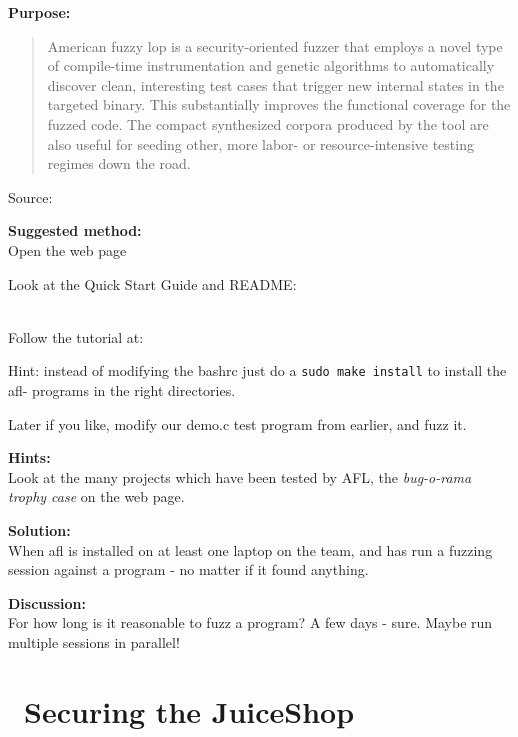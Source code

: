 \documentclass[a4paper,11pt,notitlepage]{report}
\begin{document}
{\bf Purpose:}
\begin{quote}
American fuzzy lop is a security-oriented fuzzer that employs a novel type of compile-time instrumentation and genetic algorithms to automatically discover clean, interesting test cases that trigger new internal states in the targeted binary. This substantially improves the functional coverage for the fuzzed code. The compact synthesized corpora produced by the tool are also useful for seeding other, more labor- or resource-intensive testing regimes down the road.
\end{quote}
Source: 

{\bf Suggested method:}\\
Open the web page 

Look at the Quick Start Guide and README:\\
\\

Follow the tutorial at:\\

Hint: instead of modifying the bashrc just do a \verb+sudo make install+ to install the afl- programs in the right directories.

Later if you like, modify our demo.c test program from earlier, and fuzz it.

{\bf Hints:}\\
Look at the many projects which have been tested by AFL, the \emph{bug-o-rama trophy case} on the web page.

{\bf Solution:}\\
When afl is installed on at least one laptop on the team, and has run a fuzzing session against a program - no matter if it found anything.

{\bf Discussion:}\\
For how long is it reasonable to fuzz a program? A few days - sure. Maybe run multiple sessions in parallel!






\chapter{\faExclamationTriangle\ Securing the JuiceShop}
\label{ex:secure-juiceshop}
\end{document}
